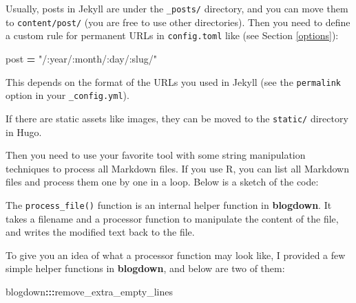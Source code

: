 \documentclass[12pt,]{krantz}
\makeatletter
\newenvironment{Shaded}{\begin{snugshade}}{\end{snugshade}}
\newcommand{\KeywordTok}[1]{\textcolor[rgb]{0.13,0.29,0.53}{\textbf{#1}}}
\newcommand{\DataTypeTok}[1]{\textcolor[rgb]{0.13,0.29,0.53}{#1}}
\newcommand{\StringTok}[1]{\textcolor[rgb]{0.31,0.60,0.02}{#1}}
\newcommand{\CommentTok}[1]{\textcolor[rgb]{0.56,0.35,0.01}{\textit{#1}}}
\newcommand{\OtherTok}[1]{\textcolor[rgb]{0.56,0.35,0.01}{#1}}
\newcommand{\ControlFlowTok}[1]{\textcolor[rgb]{0.13,0.29,0.53}{\textbf{#1}}}
\newcommand{\OperatorTok}[1]{\textcolor[rgb]{0.81,0.36,0.00}{\textbf{#1}}}
\newcommand{\NormalTok}[1]{#1}
\newenvironment{kframe}{%
\medskip{}
\setlength{\fboxsep}{.8em}
 \def\at@end@of@kframe{}%
 \ifinner\ifhmode%
  \def\at@end@of@kframe{\end{minipage}}%
  \begin{minipage}{\columnwidth}%
 \fi\fi%
 \def\FrameCommand##1{\hskip\@totalleftmargin \hskip-\fboxsep
 \colorbox{shadecolor}{##1}\hskip-\fboxsep
     \hskip-\linewidth \hskip-\@totalleftmargin \hskip\columnwidth}%
 \MakeFramed {\advance\hsize-\width
   \@totalleftmargin\z@ \linewidth\hsize
   \@setminipage}}%
 {\par\unskip\endMakeFramed%
 \at@end@of@kframe}
\renewenvironment{Shaded}{\begin{kframe}}{\end{kframe}}
\theoremstyle{definition}
\theoremstyle{definition}
\theoremstyle{definition}
\theoremstyle{remark}
\makeatother
\begin{document}
Usually, posts in Jekyll are under the \texttt{\_posts/} directory, and
you can move them to \texttt{content/post/} (you are free to use other
directories). Then you need to define a custom rule for permanent URLs
in \texttt{config.toml} like (see Section \ref{options}):

\begin{Shaded}
\begin{Highlighting}[]
\NormalTok{[permalinks]}
\NormalTok{    post }\OperatorTok{=} \StringTok{"/:year/:month/:day/:slug/"}
\end{Highlighting}
\end{Shaded}

This depends on the format of the URLs you used in Jekyll (see the
\texttt{permalink} option in your \texttt{\_config.yml}).

If there are static assets like images, they can be moved to the
\texttt{static/} directory in Hugo.

Then you need to use your favorite tool with some string manipulation
techniques to process all Markdown files. If you use R, you can list all
Markdown files and process them one by one in a loop. Below is a sketch
of the code:

\begin{Shaded}
\end{Shaded}

The \texttt{process\_file()} function is an internal helper function in
\textbf{blogdown}. It takes a filename and a processor function to
manipulate the content of the file, and writes the modified text back to
the file.

To give you an idea of what a processor function may look like, I
provided a few simple helper functions in \textbf{blogdown}, and below
are two of them:

\begin{Shaded}
\begin{Highlighting}[]
\NormalTok{blogdown}\OperatorTok{:::}\NormalTok{remove_extra_empty_lines}
\end{Highlighting}
\end{Shaded}
\end{document}
